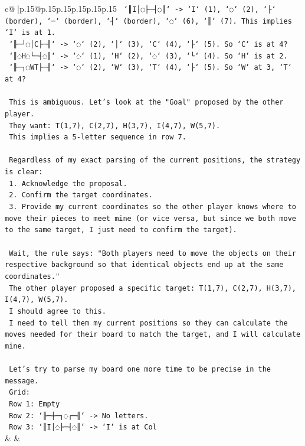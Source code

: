 \documentclass{article}
\begin{document}
{\begin{supertabular}{c@{$\;$}|p{.15\linewidth}@{}p{.15\linewidth}p{.15\linewidth}p{.15\linewidth}p{.15\linewidth}p{.15\linewidth}}
{{{\texttt{   `║I│◌├─┤◌║` {-}> `I` (1), `◌` (2), `├` (border), `─` (border), `┤` (border), `◌` (6), `║` (7). This implies `I` is at 1.} \\
\texttt{   `╟─┘◌│C├─╢` {-}> `◌` (2), `│` (3), `C` (4), `├` (5). So `C` is at 4?} \\
\texttt{   `║◌H◌└─┤◌║` {-}> `◌` (1), `H` (2), `◌` (3), `└` (4). So `H` is at 2.} \\
\texttt{   `╟─┐◌WT├─╢` {-}> `◌` (2), `W` (3), `T` (4), `├` (5). So `W` at 3, `T` at 4?} \\
\\ 
\texttt{   This is ambiguous. Let's look at the "Goal" proposed by the other player.} \\
\texttt{   They want: T(1,7), C(2,7), H(3,7), I(4,7), W(5,7).} \\
\texttt{   This implies a 5{-}letter sequence in row 7.} \\
\\ 
\texttt{   Regardless of my exact parsing of the current positions, the strategy is clear:} \\
\texttt{   1. Acknowledge the proposal.} \\
\texttt{   2. Confirm the target coordinates.} \\
\texttt{   3. Provide my current coordinates so the other player knows where to move their pieces to meet mine (or vice versa, but since we both move to the same target, I just need to confirm the target).} \\
\\ 
\texttt{   Wait, the rule says: "Both players need to move the objects on their respective background so that identical objects end up at the same coordinates."} \\
\texttt{   The other player proposed a specific target: T(1,7), C(2,7), H(3,7), I(4,7), W(5,7).} \\
\texttt{   I should agree to this.} \\
\texttt{   I need to tell them my current positions so they can calculate the moves needed for their board to match the target, and I will calculate mine.} \\
\\ 
\texttt{   Let's try to parse my board one more time to be precise in the message.} \\
\texttt{   Grid:} \\
\texttt{   Row 1: Empty} \\
\texttt{   Row 2: `╟─┼─┐◌┌─╢` {-}> No letters.} \\
\texttt{   Row 3: `║I│◌├─┤◌║` {-}> `I` is at Col} \\
            }
        }
    }
    & & \\ \\


\end{supertabular}}
\end{document}
